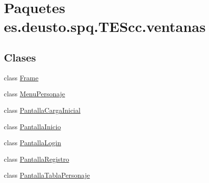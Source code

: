\hypertarget{namespacees_1_1deusto_1_1spq_1_1_t_e_scc_1_1ventanas}{\section{Paquetes es.\+deusto.\+spq.\+T\+E\+Scc.\+ventanas}
\label{namespacees_1_1deusto_1_1spq_1_1_t_e_scc_1_1ventanas}
}
\subsection*{Clases}
\begin{DoxyCompactItemize}
\item 
class \hyperlink{classes_1_1deusto_1_1spq_1_1_t_e_scc_1_1ventanas_1_1_frame}{Frame}
\item 
class \hyperlink{classes_1_1deusto_1_1spq_1_1_t_e_scc_1_1ventanas_1_1_menu_personaje}{Menu\+Personaje}
\item 
class \hyperlink{classes_1_1deusto_1_1spq_1_1_t_e_scc_1_1ventanas_1_1_pantalla_carga_inicial}{Pantalla\+Carga\+Inicial}
\item 
class \hyperlink{classes_1_1deusto_1_1spq_1_1_t_e_scc_1_1ventanas_1_1_pantalla_inicio}{Pantalla\+Inicio}
\item 
class \hyperlink{classes_1_1deusto_1_1spq_1_1_t_e_scc_1_1ventanas_1_1_pantalla_login}{Pantalla\+Login}
\item 
class \hyperlink{classes_1_1deusto_1_1spq_1_1_t_e_scc_1_1ventanas_1_1_pantalla_registro}{Pantalla\+Registro}
\item 
class \hyperlink{classes_1_1deusto_1_1spq_1_1_t_e_scc_1_1ventanas_1_1_pantalla_tabla_personaje}{Pantalla\+Tabla\+Personaje}
\end{DoxyCompactItemize}
